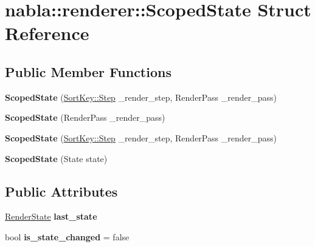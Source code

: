 \hypertarget{structnabla_1_1renderer_1_1_scoped_state}{}\section{nabla\+::renderer\+::Scoped\+State Struct Reference}
\label{structnabla_1_1renderer_1_1_scoped_state}
\subsection*{Public Member Functions}
\begin{DoxyCompactItemize}
\item 
\mbox{\label{structnabla_1_1renderer_1_1_scoped_state_a431ceb8491dfb965039f8d39ce4e9b67}} 
{\bfseries Scoped\+State} (\mbox{\hyperlink{structnabla_1_1renderer_1_1_sort_key_ae0121b7c60133bb8c0bf82785307f53a}{Sort\+Key\+::\+Step}} \+\_\+render\+\_\+step, Render\+Pass \+\_\+render\+\_\+pass)
\item 
\mbox{\label{structnabla_1_1renderer_1_1_scoped_state_ad82bf25015efba3e9279a92e4d6a1369}} 
{\bfseries Scoped\+State} (Render\+Pass \+\_\+render\+\_\+pass)
\item 
\mbox{\label{structnabla_1_1renderer_1_1_scoped_state_a431ceb8491dfb965039f8d39ce4e9b67}} 
{\bfseries Scoped\+State} (\mbox{\hyperlink{structnabla_1_1renderer_1_1_sort_key_ae0121b7c60133bb8c0bf82785307f53a}{Sort\+Key\+::\+Step}} \+\_\+render\+\_\+step, Render\+Pass \+\_\+render\+\_\+pass)
\item 
\mbox{\label{structnabla_1_1renderer_1_1_scoped_state_a42e009682cd63abbfdd021a8122d0271}} 
{\bfseries Scoped\+State} (State state)
\end{DoxyCompactItemize}
\subsection*{Public Attributes}
\begin{DoxyCompactItemize}
\item 
\mbox{\label{structnabla_1_1renderer_1_1_scoped_state_ae19315db9ad3de20c7bf85a1f88d4eb1}} 
\mbox{\hyperlink{structnabla_1_1renderer_1_1_render_state}{Render\+State}} {\bfseries last\+\_\+state}
\item 
\mbox{\label{structnabla_1_1renderer_1_1_scoped_state_a715aa65cd360eb3a324d4baff1b15e13}} 
bool {\bfseries is\+\_\+state\+\_\+changed} = false
\end{DoxyCompactItemize}


